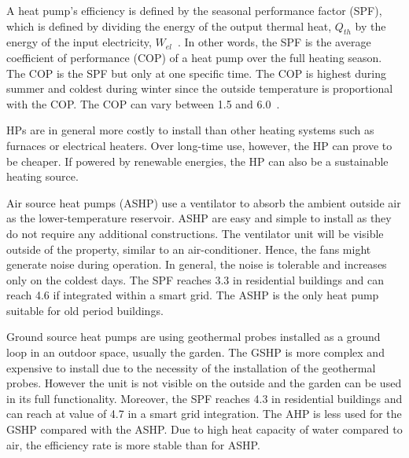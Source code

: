 A heat pump's efficiency is defined by the seasonal performance factor (SPF), which is defined by dividing the energy of the output thermal heat, $Q_{th}$ by the energy of the input electricity, $W_{el}$~\cite{DINCER2015131}. In other words, the SPF is the average coefficient of performance (COP) of a heat pump over the full heating season. The COP is the SPF but only at one specific time. The COP is highest during summer and coldest during winter since the outside temperature is proportional with the COP. The COP can vary between 1.5 and 6.0~\cite{SARBU2017347}. 

HPs are in general more costly to install than other heating systems such as furnaces or electrical heaters. Over long-time use, however, the HP can prove to be cheaper. If powered by renewable energies, the HP can also be a sustainable heating source.  

Air source heat pumps (ASHP) use a ventilator to absorb the ambient outside air as the lower-temperature reservoir. ASHP are easy and simple to install as they do not require any additional constructions. The ventilator unit will be visible outside of the property, similar to an air-conditioner. Hence, the fans might generate noise during operation. In general, the noise is tolerable and increases only on the coldest days. The SPF reaches 3.3 in residential buildings and can reach 4.6 if integrated within a smart grid. 
The ASHP is the only heat pump suitable for old period buildings. %

Ground source heat pumps are using geothermal probes installed as a ground loop in an outdoor space, usually the garden. The GSHP is more complex and expensive to install due to the necessity of the installation of the geothermal probes. However the unit is not visible on the outside and the garden can be used in its full functionality. Moreover, the SPF reaches 4.3 in residential buildings and can reach at value of 4.7 in a smart grid integration. %
The AHP is less used for the GSHP compared with the ASHP. Due to high heat capacity of water compared to air, the efficiency rate is more stable than for ASHP. %

